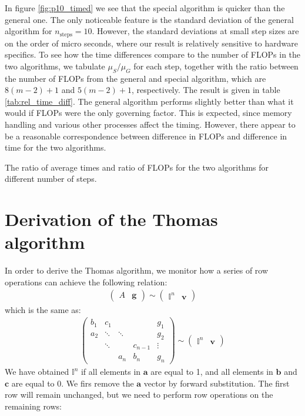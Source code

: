 \documentclass[english,notitlepage,nofootinbib]{revtex4-1}  %
\renewcommand{\vec}{\mathbf}
\begin{document}
In figure \ref{fig:p10_timed} we see that the special algorithm is quicker than the general one. The only noticeable feature is the standard deviation of the general algorithm for $n_\mathrm{steps}=10$. However, the standard deviations at small step sizes are on the order of micro seconds, where our result is relatively sensitive to hardware specifics. To see how the time differences compare to the number of FLOPs in the two algorithms, we tabulate $\mu_S/\mu_G$ for each step, together with the ratio between the number of FLOPs from the general and special algorithm, which are $8(m-2)+1$ and $5(m-2)+1$, respectively. The result is given in table \ref{tab:rel_time_diff}. The general algorithm performs slightly better than what it would if FLOPs were the only governing factor. This is expected, since memory handling and various other processes affect the timing. However, there appear to be a reasonable correspondence between difference in FLOPs and difference in time for the two algorithms.    

\begin{table}
    
    \caption{The ratio of average times and ratio of FLOPs for the two algorithms for different number of steps.}
    \label{tab:rel_time_diff}
\end{table}

\appendix

\section{Derivation of the Thomas algorithm}\label{Apx:Thomas_algorithm}

In order to derive the Thomas algorithm, we monitor how a series of row operations can achieve the following relation:
\begin{align*}
    \begin{pmatrix}
        A & \vec{g} 
    \end{pmatrix}
    \sim 
    \begin{pmatrix}
        \mathbb{I}^n & \vec{v}
    \end{pmatrix}
\end{align*}
which is the same as:
\begin{align*}
    \begin{pmatrix}
        b_1 & c_1 & &  & g_1 \\
        a_2 & \ddots & \ddots & & g_2 \\ 
         & \ddots & & c_{n-1} & \vdots \\
          & & a_n & b_n & g_n
    \end{pmatrix}
    \sim 
    \begin{pmatrix}
        \mathbb{I}^n & \vec{v}
    \end{pmatrix}
\end{align*}
We have obtained $\mathbb{I}^n$ if all elements in $\vec{a}$ are equal to 1, and all elements in $\vec{b}$ and $\vec{c}$ are equal to 0. We firs remove the $\vec{a}$ vector by forward substitution. The first row will remain unchanged, but we need to perform row operations on the remaining rows:
\end{document}

